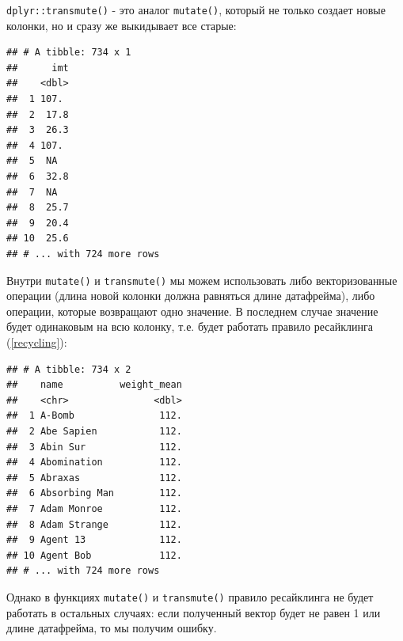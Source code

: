 \documentclass[]{book}
\newenvironment{Shaded}{\begin{snugshade}}{\end{snugshade}}
\newcommand{\KeywordTok}[1]{\textcolor[rgb]{0.13,0.29,0.53}{\textbf{#1}}}
\newcommand{\DataTypeTok}[1]{\textcolor[rgb]{0.13,0.29,0.53}{#1}}
\newcommand{\DecValTok}[1]{\textcolor[rgb]{0.00,0.00,0.81}{#1}}
\newcommand{\StringTok}[1]{\textcolor[rgb]{0.31,0.60,0.02}{#1}}
\newcommand{\OtherTok}[1]{\textcolor[rgb]{0.56,0.35,0.01}{#1}}
\newcommand{\OperatorTok}[1]{\textcolor[rgb]{0.81,0.36,0.00}{\textbf{#1}}}
\newcommand{\NormalTok}[1]{#1}
\begin{document}
\texttt{dplyr::transmute()} - это аналог \texttt{mutate()}, который не
только создает новые колонки, но и сразу же выкидывает все старые:

\begin{Shaded}
\end{Shaded}

\begin{verbatim}
## # A tibble: 734 x 1
##      imt
##    <dbl>
##  1 107. 
##  2  17.8
##  3  26.3
##  4 107. 
##  5  NA  
##  6  32.8
##  7  NA  
##  8  25.7
##  9  20.4
## 10  25.6
## # ... with 724 more rows
\end{verbatim}

Внутри \texttt{mutate()} и \texttt{transmute()} мы можем использовать
либо векторизованные операции (длина новой колонки должна равняться
длине датафрейма), либо операции, которые возвращают одно значение. В
последнем случае значение будет одинаковым на всю колонку, т.е. будет
работать правило ресайклинга (\ref{recycling}):

\begin{Shaded}
\end{Shaded}

\begin{verbatim}
## # A tibble: 734 x 2
##    name          weight_mean
##    <chr>               <dbl>
##  1 A-Bomb               112.
##  2 Abe Sapien           112.
##  3 Abin Sur             112.
##  4 Abomination          112.
##  5 Abraxas              112.
##  6 Absorbing Man        112.
##  7 Adam Monroe          112.
##  8 Adam Strange         112.
##  9 Agent 13             112.
## 10 Agent Bob            112.
## # ... with 724 more rows
\end{verbatim}

Однако в функциях \texttt{mutate()} и \texttt{transmute()} правило
ресайклинга не будет работать в остальных случаях: если полученный
вектор будет не равен 1 или длине датафрейма, то мы получим ошибку.
\end{document}
